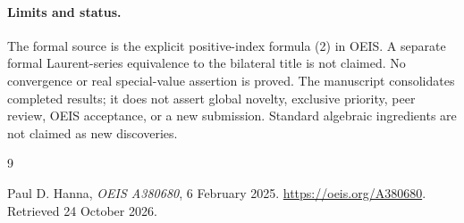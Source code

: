 \documentclass[11pt,a4paper]{article}
\theoremstyle{remark}
\begin{document}
\paragraph{Limits and status.}
The formal source is the explicit positive-index formula (2) in OEIS. A separate formal Laurent-series equivalence to the bilateral title is not claimed. No convergence or real special-value assertion is proved.
The manuscript consolidates completed results; it does not assert global
novelty, exclusive priority, peer review, OEIS acceptance, or a new submission.
Standard algebraic ingredients are not claimed as new discoveries.

\begin{thebibliography}{9}
\raggedright
{}
Paul D. Hanna, \emph{OEIS A380680}, 6 February 2025.
\url{https://oeis.org/A380680}. Retrieved 24 October 2026.
\end{thebibliography}
\end{document}
